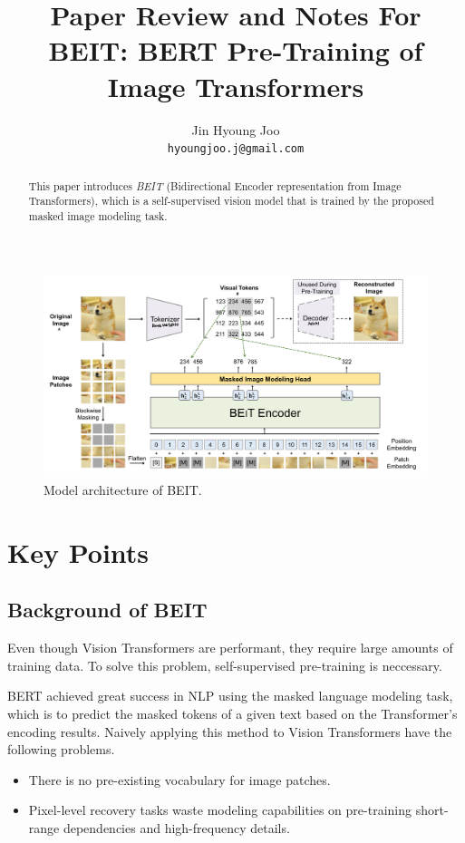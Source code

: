 \documentclass[10pt,twocolumn,letterpaper]{article}
\begin{document}
\title{Paper Review and Notes For\\BEIT: BERT Pre-Training of Image Transformers}

\author{Jin Hyoung Joo\\ {\tt\small hyoungjoo.j@gmail.com} }
\maketitle

\begin{abstract}
    This paper \cite{BEIT} introduces \emph{BEIT} (Bidirectional Encoder representation
    from Image Transformers), which is a self-supervised vision model that is trained
    by the proposed masked image modeling task.
\end{abstract}

\begin{figure}[ht]
  \centering
   \includegraphics[width=\linewidth]{figures/model-architecture.jpeg}
   \caption{Model architecture of BEIT.}
\end{figure}

\section{Key Points}
\subsection{Background of BEIT}
Even though Vision Transformers are performant, they require large amounts of training data.
To solve this problem, self-supervised pre-training is neccessary.

BERT achieved great success in NLP using the masked language modeling task, which is to predict
the masked tokens of a given text based on the Transformer's encoding results.
Naively applying this method to Vision Transformers have the following problems.
\begin{itemize}
    \item{There is no pre-existing vocabulary for image patches.}
    \item{Pixel-level recovery tasks waste modeling capabilities on pre-training short-range dependencies
        and high-frequency details.}
\end{itemize}
\end{document}
